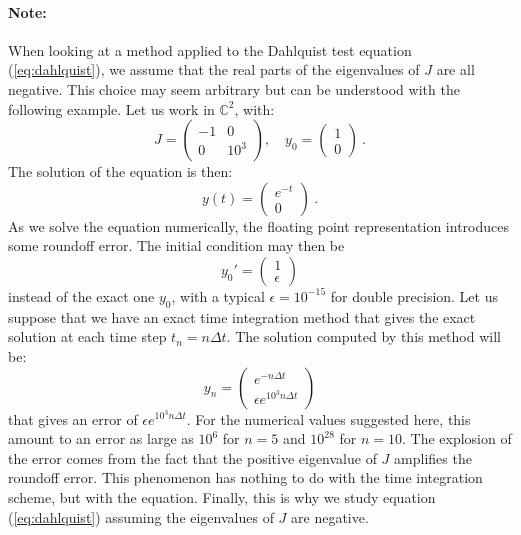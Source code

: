         \paragraph{Note:}
        When looking at a method applied to the Dahlquist test equation (\ref{eq:dahlquist}), we assume that the real parts of the eigenvalues of $J$ are all negative.
        This choice may seem arbitrary but can be understood with the following example.
        Let us work in $\mathbb{C}^2$, with:
        \begin{equation}
          J = \begin{pmatrix} -1 & 0 \\ 0 & 10^3 \end{pmatrix}, \quad y_0 = \begin{pmatrix} 1 \\ 0 \end{pmatrix} \ .
        \end{equation}
        The solution of the equation is then:
        \begin{equation}
          y\left(t\right) = \begin{pmatrix} e^{-t} \\ 0 \end{pmatrix} \ .
        \end{equation}
        As we solve the equation numerically, the floating point representation introduces some roundoff error.
        The initial condition may then be
        \begin{equation}
          y_0' = \begin{pmatrix} 1 \\ \epsilon \end{pmatrix}
        \end{equation}
        instead of the exact one $y_0$, with a typical $\epsilon = 10^{-15}$ for double precision.
        Let us suppose that we have an exact time integration method that gives the exact solution at each time step $t_n = n\Delta t$.
        The solution computed by this method will be:
        \begin{equation}
          y_n = \begin{pmatrix} e^{-n\Delta t} \\ \epsilon e^{10^3 n \Delta t} \end{pmatrix}
        \end{equation}
        that gives an error of $\epsilon e^{10^3 n\Delta t}$.
        For the numerical values suggested here, this amount to an error as large as $10^6$ for $n = 5$ and $10^{28}$ for $n = 10$.
        The explosion of the error comes from the fact that the positive eigenvalue of $J$ amplifies the roundoff error.
        This phenomenon has nothing to do with the time integration scheme, but with the equation.
        Finally, this is why we study equation (\ref{eq:dahlquist}) assuming the eigenvalues of $J$ are negative.


